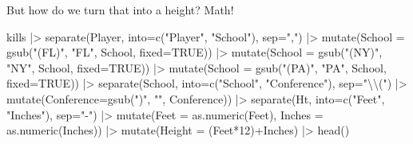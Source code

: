 \documentclass[
  letterpaper,
  DIV=11,
  numbers=noendperiod]{scrreprt}
\newenvironment{Shaded}{\begin{snugshade}}{\end{snugshade}}
\newcommand{\AttributeTok}[1]{\textcolor[rgb]{0.40,0.45,0.13}{#1}}
\newcommand{\ConstantTok}[1]{\textcolor[rgb]{0.56,0.35,0.01}{#1}}
\newcommand{\DecValTok}[1]{\textcolor[rgb]{0.68,0.00,0.00}{#1}}
\newcommand{\FunctionTok}[1]{\textcolor[rgb]{0.28,0.35,0.67}{#1}}
\newcommand{\NormalTok}[1]{\textcolor[rgb]{0.00,0.23,0.31}{#1}}
\newcommand{\SpecialCharTok}[1]{\textcolor[rgb]{0.37,0.37,0.37}{#1}}
\newcommand{\StringTok}[1]{\textcolor[rgb]{0.13,0.47,0.30}{#1}}
\begin{document}
But how do we turn that into a height? Math!

\begin{Shaded}
\begin{Highlighting}[]
\NormalTok{kills }\SpecialCharTok{|\textgreater{}} 
  \FunctionTok{separate}\NormalTok{(Player, }\AttributeTok{into=}\FunctionTok{c}\NormalTok{(}\StringTok{"Player"}\NormalTok{, }\StringTok{"School"}\NormalTok{), }\AttributeTok{sep=}\StringTok{","}\NormalTok{) }\SpecialCharTok{|\textgreater{}} 
  \FunctionTok{mutate}\NormalTok{(}\AttributeTok{School =} \FunctionTok{gsub}\NormalTok{(}\StringTok{"(FL)"}\NormalTok{, }\StringTok{"FL"}\NormalTok{, School, }\AttributeTok{fixed=}\ConstantTok{TRUE}\NormalTok{)) }\SpecialCharTok{|\textgreater{}}
  \FunctionTok{mutate}\NormalTok{(}\AttributeTok{School =} \FunctionTok{gsub}\NormalTok{(}\StringTok{"(NY)"}\NormalTok{, }\StringTok{"NY"}\NormalTok{, School, }\AttributeTok{fixed=}\ConstantTok{TRUE}\NormalTok{)) }\SpecialCharTok{|\textgreater{}}
  \FunctionTok{mutate}\NormalTok{(}\AttributeTok{School =} \FunctionTok{gsub}\NormalTok{(}\StringTok{"(PA)"}\NormalTok{, }\StringTok{"PA"}\NormalTok{, School, }\AttributeTok{fixed=}\ConstantTok{TRUE}\NormalTok{)) }\SpecialCharTok{|\textgreater{}}
  \FunctionTok{separate}\NormalTok{(School, }\AttributeTok{into=}\FunctionTok{c}\NormalTok{(}\StringTok{"School"}\NormalTok{, }\StringTok{"Conference"}\NormalTok{), }\AttributeTok{sep=}\StringTok{"}\SpecialCharTok{\textbackslash{}\textbackslash{}}\StringTok{("}\NormalTok{) }\SpecialCharTok{|\textgreater{}} 
  \FunctionTok{mutate}\NormalTok{(}\AttributeTok{Conference=}\FunctionTok{gsub}\NormalTok{(}\StringTok{")"}\NormalTok{, }\StringTok{""}\NormalTok{, Conference)) }\SpecialCharTok{|\textgreater{}}
  \FunctionTok{separate}\NormalTok{(Ht, }\AttributeTok{into=}\FunctionTok{c}\NormalTok{(}\StringTok{"Feet"}\NormalTok{, }\StringTok{"Inches"}\NormalTok{), }\AttributeTok{sep=}\StringTok{"{-}"}\NormalTok{) }\SpecialCharTok{|\textgreater{}}
  \FunctionTok{mutate}\NormalTok{(}\AttributeTok{Feet =} \FunctionTok{as.numeric}\NormalTok{(Feet), }\AttributeTok{Inches =} \FunctionTok{as.numeric}\NormalTok{(Inches)) }\SpecialCharTok{|\textgreater{}}
  \FunctionTok{mutate}\NormalTok{(}\AttributeTok{Height =}\NormalTok{ (Feet}\SpecialCharTok{*}\DecValTok{12}\NormalTok{)}\SpecialCharTok{+}\NormalTok{Inches) }\SpecialCharTok{|\textgreater{}}
  \FunctionTok{head}\NormalTok{()}
\end{Highlighting}
\end{Shaded}
\end{document}
